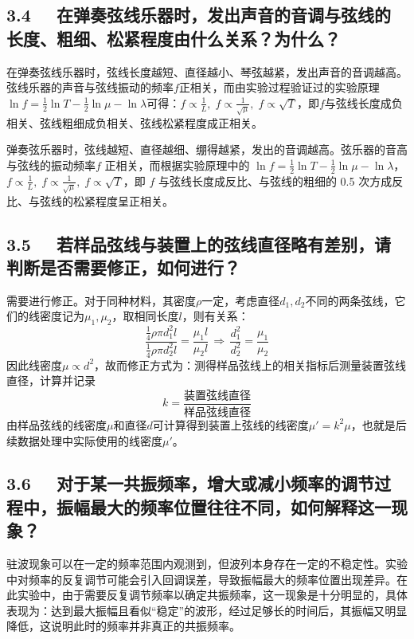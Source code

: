 \documentclass[UTF8]{article}
\theoremstyle{MyLineTheoremStyle} %
\theoremstyle{MyBlockTheoremStyle} %
\theoremstyle{MySubsubsectionStyle} %
\begin{document}
\subsection*{3.4 \ \ 在弹奏弦线乐器时，发出声音的音调与弦线的长度、粗细、松紧程度由什么关系？为什么？}
在弹奏弦线乐器时，弦线长度越短、直径越小、琴弦越紧，发出声音的音调越高。弦线乐器的声音与弦线振动的频率$ f $正相关，而由实验过程验证过的实验原理$ \ln f=\frac12\ln T-\frac12\ln\mu-\ln\lambda $可得：$ f\propto\frac1L,\;f\propto\frac{1}{\sqrt\mu},\;f\propto\sqrt T $，即$ f $与弦线长度成负相关、弦线粗细成负相关、弦线松紧程度成正相关。

弹奏弦乐器时，弦线越短、直径越细、绷得越紧，发出的音调越高。弦乐器的音高与弦线的振动频率$ f $ 正相关，而根据实验原理中的 $ \ln f=\frac12\ln T-\frac12\ln\mu-\ln\lambda $，$ f\propto\frac1L,\;f\propto\frac{1}{\sqrt\mu},\;f\propto\sqrt T $，即 $ f $ 与弦线长度成反比、与弦线的粗细的 0.5 次方成反比、与弦线的松紧程度呈正相关。

\subsection*{3.5 \ \  若样品弦线与装置上的弦线直径略有差别，请判断是否需要修正，如何进行？}

需要进行修正。对于同种材料，其密度$ \rho $一定，考虑直径$ d_1,d_2 $不同的两条弦线，它们的线密度记为$ \mu_1,\mu_2 $，取相同长度$ l $，则有关系：
\begin{equation}
\frac{\frac{1}{4}\rho\pi d_1^2l}{\frac{1}{4} \rho\pi d_2^2l}=\frac{\mu_1l}{\mu_2l}\,\Longrightarrow\,\frac{d_1^2}{d_2^2}=\frac{\mu_1}{\mu_2}
\end{equation}
因此线密度$ \mu\propto d^2 $，故而修正方式为：测得样品弦线上的相关指标后测量装置弦线直径，计算并记录
\begin{equation}
    k=\frac{\text{装置弦线直径}}{\text{样品弦线直径}} 
\end{equation}
由样品弦线的线密度$ \mu $和直径$ d $可计算得到装置上弦线的线密度$ \mu'=k^2\mu $，也就是后续数据处理中实际使用的线密度$ \mu' $。


\subsection*{3.6 \ \  对于某一共振频率，增大或减小频率的调节过程中，振幅最大的频率位置往往不同，如何解释这一现象？}
驻波现象可以在一定的频率范围内观测到，但波列本身存在一定的不稳定性。实验中对频率的反复调节可能会引入回调误差，导致振幅最大的频率位置出现差异。在此实验中，由于需要反复调节频率以确定共振频率，这一现象是十分明显的，具体表现为：达到最大振幅且看似“稳定”的波形，经过足够长的时间后，其振幅又明显降低，这说明此时的频率并非真正的共振频率。
\end{document}
